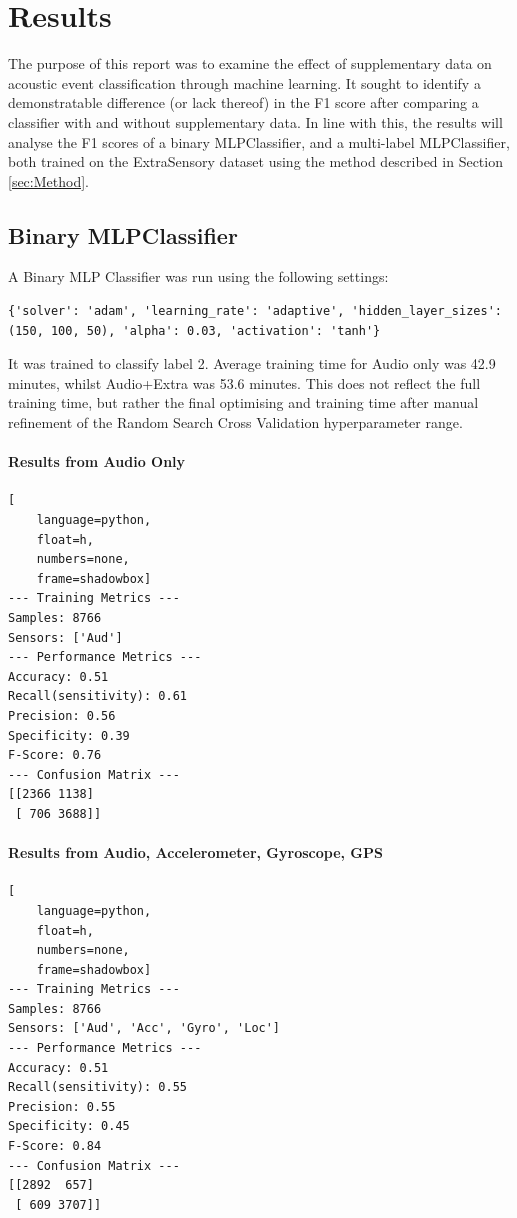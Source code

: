 \documentclass{UoNMCHA}
\newcommand{\sref}[1] {Section \ref{#1}}
\numberwithin{equation}{section}
\begin{document}
\clearpage \section{Results} \label{sec:Results}
The purpose of this report was to examine the effect of supplementary data on acoustic event classification through machine learning. It sought to identify a demonstratable difference (or lack thereof) in the F1 score after comparing a classifier with and without supplementary data. In line with this, the results will analyse the F1 scores of a binary MLPClassifier, and a multi-label MLPClassifier, both trained on the ExtraSensory dataset using the method described in \sref{sec:Method}.

\subsection{Binary MLPClassifier}

A Binary MLP Classifier was run using the following settings:
\begin{lstlisting}[breaklines=true]
    {'solver': 'adam', 'learning_rate': 'adaptive', 'hidden_layer_sizes': (150, 100, 50), 'alpha': 0.03, 'activation': 'tanh'}
\end{lstlisting}
It was trained to classify label 2. Average training time for Audio only was 42.9 minutes, whilst Audio+Extra was 53.6 minutes. This does not reflect the full training time, but rather the final optimising and training time after manual refinement of the Random Search Cross Validation hyperparameter range.

\paragraph{Results from Audio Only}
\begin{lstlisting}[
    language=python,
    float=h,
    numbers=none,
    frame=shadowbox]
--- Training Metrics ---
Samples: 8766
Sensors: ['Aud']
--- Performance Metrics ---
Accuracy: 0.51
Recall(sensitivity): 0.61
Precision: 0.56
Specificity: 0.39
F-Score: 0.76
--- Confusion Matrix ---
[[2366 1138]
 [ 706 3688]]
\end{lstlisting}

\paragraph{Results from Audio, Accelerometer, Gyroscope, GPS}

\begin{lstlisting}[
    language=python,
    float=h,
    numbers=none,
    frame=shadowbox]
--- Training Metrics ---
Samples: 8766
Sensors: ['Aud', 'Acc', 'Gyro', 'Loc']
--- Performance Metrics ---
Accuracy: 0.51
Recall(sensitivity): 0.55
Precision: 0.55
Specificity: 0.45
F-Score: 0.84
--- Confusion Matrix ---
[[2892  657]
 [ 609 3707]]
\end{lstlisting}
\end{document}

